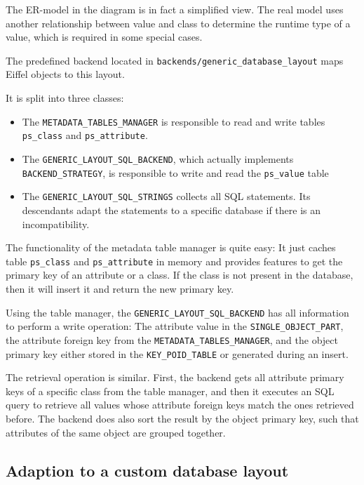 The ER-model in the diagram is in fact a simplified view. 
The real model uses another relationship between value and class to determine the runtime type of a value, which is required in some special cases.

The predefined backend located in \lstinline!backends/generic_database_layout! maps Eiffel objects to this layout.

It is split into three classes:
\begin{itemize}
 \item The \lstinline!METADATA_TABLES_MANAGER! is responsible to read and write tables \lstinline!ps_class! and \lstinline!ps_attribute!.
 \item The \lstinline!GENERIC_LAYOUT_SQL_BACKEND!, which actually implements \lstinline!BACKEND_STRATEGY!, is responsible to write and read the \lstinline!ps_value! table
 \item The \lstinline!GENERIC_LAYOUT_SQL_STRINGS! collects all SQL statements. Its descendants adapt the statements to a specific database if there is an incompatibility.
\end{itemize}

The functionality of the metadata table manager is quite easy:
It just caches table \lstinline!ps_class! and \lstinline!ps_attribute! in memory and provides features to get the primary key of an attribute or a class.
If the class is not present in the database, then it will insert it and return the new primary key.

Using the table manager, the \lstinline!GENERIC_LAYOUT_SQL_BACKEND! has all information to perform a write operation:
The attribute value in the \lstinline!SINGLE_OBJECT_PART!, the attribute foreign key from the \lstinline!METADATA_TABLES_MANAGER!, 
and the object primary key either stored in the \lstinline!KEY_POID_TABLE! or generated during an insert.

The retrieval operation is similar.
First, the backend gets all attribute primary keys of a specific class from the table manager, and then it executes an SQL query to retrieve all values whose attribute foreign keys match the ones retrieved before.
The backend does also sort the result by the object primary key, such that attributes of the same object are grouped together.


\subsection{Adaption to a custom database layout}
\label{subsection:specific_adaption}

